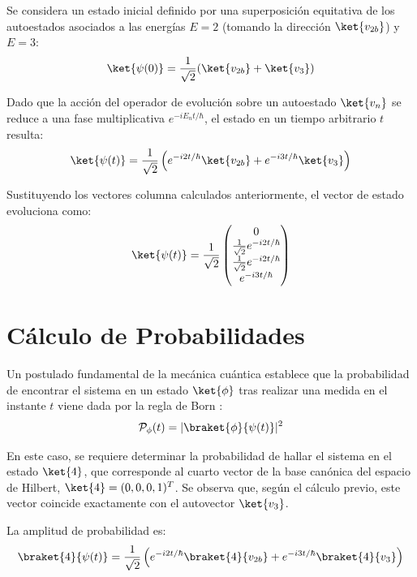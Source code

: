 \documentclass[11pt,a4paper,spanish]{book}
\begin{document}
Se considera un estado inicial definido por una superposición equitativa de los autoestados asociados a las energías $E=2$ (tomando la dirección $\ket{v_{2b}}$) y $E=3$:
\begin{equation}
    \ket{\psi(0)} = \frac{1}{\sqrt{2}} (\ket{v_{2b}} + \ket{v_3})
\end{equation}

Dado que la acción del operador de evolución sobre un autoestado $\ket{v_n}$ se reduce a una fase multiplicativa $e^{-iE_n t/\hbar}$, el estado en un tiempo arbitrario $t$ resulta:
\begin{equation}
    \ket{\psi(t)} = \frac{1}{\sqrt{2}} \left( e^{-i 2t/\hbar} \ket{v_{2b}} + e^{-i 3t/\hbar} \ket{v_3} \right)
\end{equation}

Sustituyendo los vectores columna calculados anteriormente, el vector de estado evoluciona como:
\begin{equation}
    \ket{\psi(t)} = \frac{1}{\sqrt{2}} \begin{pmatrix} 0 \\ \frac{1}{\sqrt{2}}e^{-i 2t/\hbar} \\ \frac{1}{\sqrt{2}}e^{-i 2t/\hbar} \\ e^{-i 3t/\hbar} \end{pmatrix}
\end{equation}

\section{Cálculo de Probabilidades}

Un postulado fundamental de la mecánica cuántica establece que la probabilidad de encontrar el sistema en un estado $\ket{\phi}$ tras realizar una medida en el instante $t$ viene dada por la regla de Born \citep{born1926}:
\begin{equation}
    \mathcal{P}_{\phi}(t) = |\braket{\phi}{\psi(t)}|^2
\end{equation}

En este caso, se requiere determinar la probabilidad de hallar el sistema en el estado $\ket{4}$, que corresponde al cuarto vector de la base canónica del espacio de Hilbert, $\ket{4} = (0, 0, 0, 1)^T$. Se observa que, según el cálculo previo, este vector coincide exactamente con el autovector $\ket{v_3}$.

La amplitud de probabilidad es:
\begin{equation}
    \braket{4}{\psi(t)} = \frac{1}{\sqrt{2}} \left( e^{-i 2t/\hbar} \braket{4}{v_{2b}} + e^{-i 3t/\hbar} \braket{4}{v_3} \right)
\end{equation}
\end{document}
